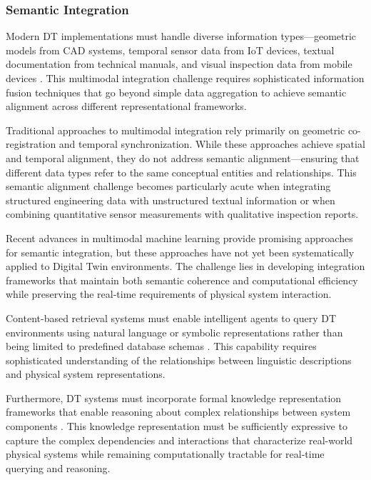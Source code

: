 \subsubsection{Semantic Integration}

Modern DT implementations must handle diverse information types—geometric models from CAD systems, temporal sensor data from IoT devices, textual documentation from technical manuals, and visual inspection data from mobile devices \cite{boje2020towards, lu2020digital}. This multimodal integration challenge requires sophisticated information fusion techniques that go beyond simple data aggregation to achieve semantic alignment across different representational frameworks.

Traditional approaches to multimodal integration rely primarily on geometric co-registration and temporal synchronization. While these approaches achieve spatial and temporal alignment, they do not address semantic alignment—ensuring that different data types refer to the same conceptual entities and relationships. This semantic alignment challenge becomes particularly acute when integrating structured engineering data with unstructured textual information or when combining quantitative sensor measurements with qualitative inspection reports.

Recent advances in multimodal machine learning \cite{baltrusaitis2018multimodal, ramesh2021zero} provide promising approaches for semantic integration, but these approaches have not yet been systematically applied to Digital Twin environments. The challenge lies in developing integration frameworks that maintain both semantic coherence and computational efficiency while preserving the real-time requirements of physical system interaction.

Content-based retrieval systems must enable intelligent agents to query DT environments using natural language or symbolic representations rather than being limited to predefined database schemas \cite{smeulders2000content, datta2008image}. This capability requires sophisticated understanding of the relationships between linguistic descriptions and physical system representations.

Furthermore, DT systems must incorporate formal knowledge representation frameworks that enable reasoning about complex relationships between system components \cite{gruber1993translation, studer1998knowledge}. This knowledge representation must be sufficiently expressive to capture the complex dependencies and interactions that characterize real-world physical systems while remaining computationally tractable for real-time querying and reasoning.


